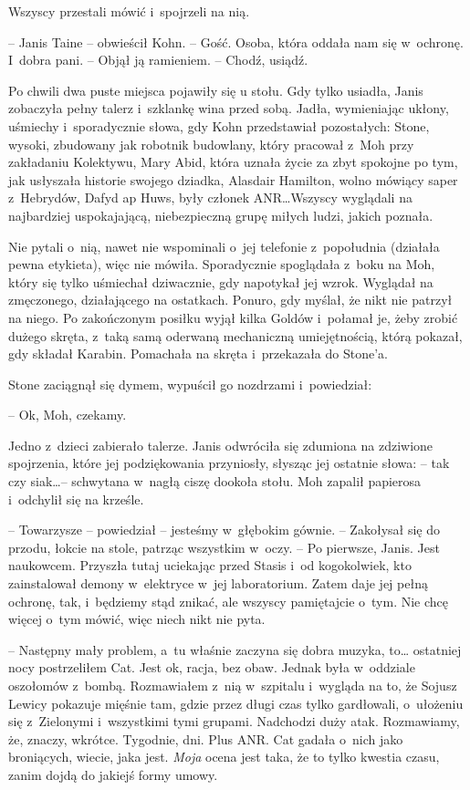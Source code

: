 \documentclass[oneside,polish,11pt,sfheadings]{mwbk}
\begin{document}
Wszyscy przestali mówić i~spojrzeli na nią.

-- Janis Taine -- obwieścił Kohn. -- Gość. Osoba, która oddała nam się w~ochronę. I~dobra pani. -- Objął ją ramieniem. -- Chodź, usiądź.

Po chwili dwa puste miejsca pojawiły się u stołu. Gdy tylko usiadła,
Janis zobaczyła pełny talerz i~szklankę wina przed sobą. Jadła,
wymieniając ukłony, uśmiechy i~sporadycznie słowa, gdy Kohn przedstawiał
pozostałych: Stone, wysoki, zbudowany jak robotnik budowlany, który
pracował z~Moh przy zakładaniu Kolektywu, Mary Abid, która uznała życie
za zbyt spokojne po tym, jak usłyszała historie swojego dziadka,
Alasdair Hamilton, wolno mówiący saper z~Hebrydów, Dafyd ap Huws, były
członek ANR\ldots Wszyscy wyglądali na najbardziej uspokajającą,
niebezpieczną grupę miłych ludzi, jakich poznała.

Nie pytali o~nią, nawet nie wspominali o~jej telefonie z~popołudnia
(działała pewna etykieta), więc nie mówiła. Sporadycznie spoglądała z~boku na Moh, który się tylko uśmiechał dziwacznie, gdy napotykał jej
wzrok. Wyglądał na zmęczonego, działającego na ostatkach. Ponuro, gdy
myślał, że nikt nie patrzył na niego. Po zakończonym posiłku wyjął kilka
Goldów i~połamał je, żeby zrobić dużego skręta, z~taką samą oderwaną
mechaniczną umiejętnością, którą pokazał, gdy składał Karabin. Pomachała
na skręta i~przekazała do Stone'a.

Stone zaciągnął się dymem, wypuścił go nozdrzami i~powiedział: 

-- Ok,
Moh, czekamy.

Jedno z~dzieci zabierało talerze. Janis odwróciła się zdumiona na
zdziwione spojrzenia, które jej podziękowania przyniosły, słysząc jej
ostatnie słowa: -- tak czy siak\ldots -- schwytana w~nagłą ciszę dookoła
stołu. Moh zapalił papierosa i~odchylił się na krześle.

-- Towarzysze -- powiedział -- jesteśmy w~głębokim gównie. -- Zakołysał się
do przodu, łokcie na stole, patrząc wszystkim w~oczy. -- Po pierwsze,
Janis. Jest naukowcem. Przyszła tutaj uciekając przed Stasis i~od
kogokolwiek, kto zainstalował demony w~elektryce w~jej laboratorium.
Zatem daje jej pełną ochronę, tak, i~będziemy stąd znikać, ale wszyscy
pamiętajcie o~tym. Nie chcę więcej o~tym mówić, więc niech nikt nie
pyta.

-- Następny mały problem, a~tu właśnie zaczyna się dobra muzyka, to\ldots
ostatniej nocy postrzeliłem Cat. Jest ok, racja, bez obaw. Jednak była w~oddziale oszołomów z~bombą. Rozmawiałem z~nią w~szpitalu i~wygląda na
to, że Sojusz Lewicy pokazuje mięśnie tam, gdzie przez długi czas tylko
gardłowali, o~ułożeniu się z~Zielonymi i~wszystkimi tymi grupami.
Nadchodzi duży atak. Rozmawiamy, że, znaczy, wkrótce. Tygodnie, dni.
Plus ANR. Cat gadała o~nich jako broniących, wiecie, jaka jest.
\emph{Moja} ocena jest taka, że to tylko kwestia czasu, zanim dojdą do
jakiejś formy umowy.
\end{document}
